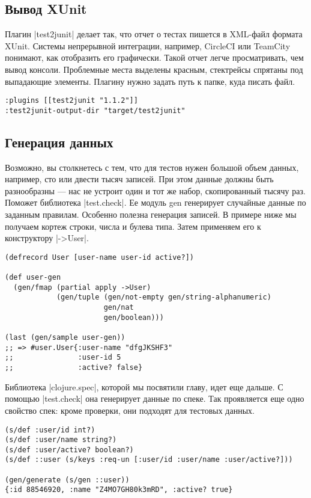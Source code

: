 \subsection{Вывод XUnit}

Плагин \spverb|test2junit|
делает так, что отчет о тестах пишется в XML-файл формата
XUnit. Системы непрерывной интеграции, например, CircleCI или TeamCity понимают,
как отобразить его графически. Такой отчет легче просматривать, чем вывод
консоли. Проблемные места выделены красным, стектрейсы спрятаны под выпадающие
элементы. Плагину нужно задать путь к папке, куда писать файл.

\begin{verbatim}
:plugins [[test2junit "1.1.2"]]
:test2junit-output-dir "target/test2junit"
\end{verbatim}

\subsection{Генерация данных}

Возможно, вы столкнетесь с тем, что для тестов нужен большой объем данных,
например, сто или двести тысяч записей. При этом данные должны быть разнообразны
— нас не устроит один и тот же набор, скопированный тысячу раз. Поможет
библиотека \spverb|test.check|. Ее модуль gen генерирует случайные данные по заданным
правилам. Особенно полезна генерация записей. В примере ниже мы получаем кортеж
строки, числа и булева типа. Затем применяем его к конструктору \spverb|->User|.

\begin{verbatim}
(defrecord User [user-name user-id active?])

(def user-gen
  (gen/fmap (partial apply ->User)
            (gen/tuple (gen/not-empty gen/string-alphanumeric)
                       gen/nat
                       gen/boolean)))

(last (gen/sample user-gen))
;; => #user.User{:user-name "dfgJKSHF3"
;;               :user-id 5
;;               :active? false}
\end{verbatim}

Библиотека \spverb|clojure.spec|, которой мы посвятили главу, идет еще дальше. С
помощью \spverb|test.check| она генерирует данные по спеке. Так проявляется еще одно
свойство спек: кроме проверки, они подходят для тестовых данных.

\begin{verbatim}
(s/def :user/id int?)
(s/def :user/name string?)
(s/def :user/active? boolean?)
(s/def ::user (s/keys :req-un [:user/id :user/name :user/active?]))

(gen/generate (s/gen ::user))
{:id 88546920, :name "Z4MO7GH80k3mRD", :active? true}
\end{verbatim}

